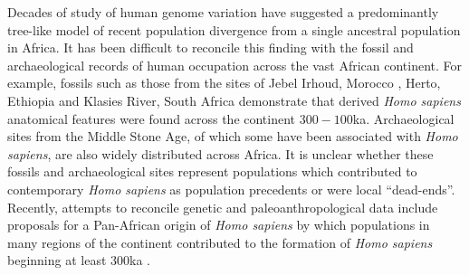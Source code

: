 \documentclass[]{article}
\begin{document}
Decades of study of human genome variation have suggested a predominantly
tree-like model of recent population divergence from a single ancestral
population in Africa. It has been difficult to reconcile this finding with the
fossil and archaeological records of human occupation across the vast African
continent. For example, fossils such as those from the sites of Jebel Irhoud,
Morocco \citep{Hublin2017-cq}, Herto, Ethiopia \citep{White2003-bk} and Klasies
River, South Africa \citep{Deacon1995-rx} demonstrate that derived \emph{Homo
sapiens} anatomical features were found across the continent $300-100$ka.
Archaeological sites from the Middle Stone Age, of which some have been
associated with \emph{Homo sapiens}, are also widely distributed across Africa.
It is unclear whether these fossils and archaeological sites represent
populations which contributed to contemporary \emph{Homo sapiens} as population
precedents or were local ``dead-ends''. Recently, attempts to reconcile genetic
and paleoanthropological data include proposals for a Pan-African origin of
\emph{Homo sapiens} by which populations in many regions of the continent
contributed to the formation of \emph{Homo sapiens} beginning at least $300$ka
\citep{Stringer2016-mj,Scerri2018-nl,Scerri2019-xg}.
\end{document}
